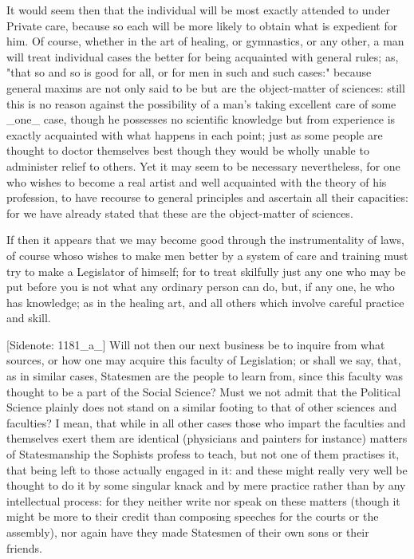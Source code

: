 It would seem then that the individual will be most exactly attended to
under Private care, because so each will be more likely to obtain what
is expedient for him. Of course, whether in the art of healing, or
gymnastics, or any other, a man will treat individual cases the better
for being acquainted with general rules; as, "that so and so is good for
all, or for men in such and such cases:" because general maxims are not
only said to be but are the object-matter of sciences: still this is no
reason against the possibility of a man's taking excellent care of
some _one_ case, though he possesses no scientific knowledge but from
experience is exactly acquainted with what happens in each point; just
as some people are thought to doctor themselves best though they would
be wholly unable to administer relief to others. Yet it may seem to be
necessary nevertheless, for one who wishes to become a real artist and
well acquainted with the theory of his profession, to have recourse
to general principles and ascertain all their capacities: for we have
already stated that these are the object-matter of sciences.

If then it appears that we may become good through the instrumentality
of laws, of course whoso wishes to make men better by a system of care
and training must try to make a Legislator of himself; for to treat
skilfully just any one who may be put before you is not what any
ordinary person can do, but, if any one, he who has knowledge; as in the
healing art, and all others which involve careful practice and skill.

[Sidenote: 1181_a_] Will not then our next business be to inquire from
what sources, or how one may acquire this faculty of Legislation; or
shall we say, that, as in similar cases, Statesmen are the people to
learn from, since this faculty was thought to be a part of the Social
Science? Must we not admit that the Political Science plainly does not
stand on a similar footing to that of other sciences and faculties? I
mean, that while in all other cases those who impart the faculties
and themselves exert them are identical (physicians and painters for
instance) matters of Statesmanship the Sophists profess to teach, but
not one of them practises it, that being left to those actually engaged
in it: and these might really very well be thought to do it by some
singular knack and by mere practice rather than by any intellectual
process: for they neither write nor speak on these matters (though it
might be more to their credit than composing speeches for the courts or
the assembly), nor again have they made Statesmen of their own sons or
their friends.

